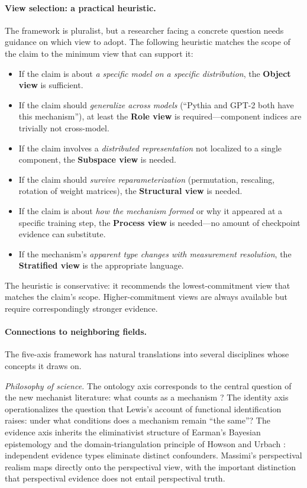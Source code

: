 \documentclass{article}
\begin{document}
\paragraph{View selection: a practical heuristic.}
The framework is pluralist, but a researcher facing a concrete question
needs guidance on which view to adopt.  The following heuristic matches
the scope of the claim to the minimum view that can support it:
\begin{itemize}[leftmargin=*]
\item If the claim is about \emph{a specific model on a specific
      distribution}, the \textbf{Object view} is sufficient.
\item If the claim should \emph{generalize across models} (``Pythia and
      GPT-2 both have this mechanism''), at least the \textbf{Role view}
      is required---component indices are trivially not cross-model.
\item If the claim involves a \emph{distributed representation} not
      localized to a single component, the \textbf{Subspace view} is
      needed.
\item If the claim should \emph{survive reparameterization}
      (permutation, rescaling, rotation of weight matrices), the
      \textbf{Structural view} is needed.
\item If the claim is about \emph{how the mechanism formed} or why it
      appeared at a specific training step, the \textbf{Process view} is
      needed---no amount of checkpoint evidence can substitute.
\item If the mechanism's \emph{apparent type changes with measurement
      resolution}, the \textbf{Stratified view} is the appropriate
      language.
\end{itemize}
The heuristic is conservative: it recommends the lowest-commitment view
that matches the claim's scope.  Higher-commitment views are always
available but require correspondingly stronger evidence.

\paragraph{Connections to neighboring fields.}
The five-axis framework has natural translations into several disciplines
whose concepts it draws on.

\emph{Philosophy of science.}
The ontology axis corresponds to the central question of the new
mechanist literature: what counts as a mechanism
\citep{machamer2000,craver2007,illari2012,glennan1996}?  The identity
axis operationalizes the question that Lewis's account of functional
identification \citep{lewis1972} raises: under what conditions does a
mechanism remain ``the same''?  The
evidence axis inherits the eliminativist structure of Earman's Bayesian
epistemology \citep{earman1992} and the domain-triangulation principle
of Howson and Urbach \citep{howson1989}: independent evidence types
eliminate distinct confounders.  Massimi's perspectival realism
\citep{massimi2022} maps directly onto the perspectival view, with
the important distinction that perspectival evidence does not entail
perspectival truth.
\end{document}
